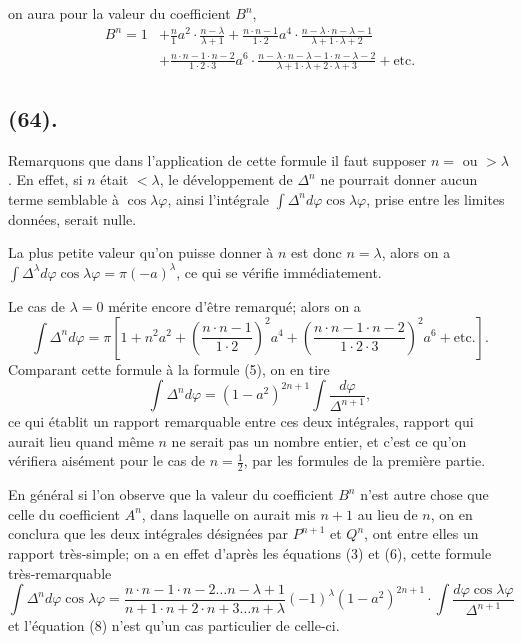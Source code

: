 \documentclass{article}
\begin{document}
on aura pour la valeur du coefficient $B^{n}$,
\[ \begin{aligned} B^{n}=1&+\frac{n}{1}a^{2}\cdot\frac{n-\lambda}{\lambda+1}+\frac{n\cdot n-1}{1\cdot2}a^{4}\cdot\frac{n-\lambda\cdot n-\lambda-1}{\lambda+1\cdot\lambda+2}\\ &+\frac{n\cdot n-1\cdot n-2}{1\cdot2\cdot3}a^{6}\cdot\frac{n-\lambda\cdot n-\lambda-1\cdot n-\lambda-2}{\lambda+1\cdot\lambda+2\cdot\lambda+3}+\text{etc.} \end{aligned} \tag{6} \]

\subsection*{(64).}

Remarquons que dans l'application de cette formule il faut supposer $n=$ ou $>\lambda$. En effet, si $n$ était $<\lambda$, le développement de $\Delta^{n}$ ne pourrait donner aucun terme semblable à $\cos\lambda\varphi$, ainsi l'intégrale $\displaystyle\int\Delta^{n}d\varphi\cos\lambda\varphi$, prise entre les limites données, serait nulle.

La plus petite valeur qu'on puisse donner à $n$ est donc $n=\lambda$, alors on a $\displaystyle\int\Delta^{\lambda}d\varphi\cos\lambda\varphi=\pi(-a)^{\lambda}$, ce qui se vérifie immédiatement.

Le cas de $\lambda=0$ mérite encore d'être remarqué; alors on a
\[ \int\Delta^{n}d\varphi=\pi\left[1+n^{2}a^{2}+\left(\frac{n\cdot n-1}{1\cdot2}\right)^{2}a^{4}+\left(\frac{n\cdot n-1\cdot n-2}{1\cdot2\cdot3}\right)^{2}a^{6}+\text{etc.}\right]. \tag{7} \]
Comparant cette formule à la formule (5), on en tire
\[ \int\Delta^{n}d\varphi=(1-a^{2})^{2n+1}\int\frac{d\varphi}{\Delta^{n+1}}, \tag{8} \]
ce qui établit un rapport remarquable entre ces deux intégrales, rapport qui aurait lieu quand même $n$ ne serait pas un nombre entier, et c'est ce qu'on vérifiera aisément pour le cas de $n=\frac{1}{2}$, par les formules de la première partie.

En général si l'on observe que la valeur du coefficient $B^{n}$ n'est autre chose que celle du coefficient $A^{n}$, dans laquelle on aurait mis $n+1$ au lieu de $n$, on en conclura que les deux intégrales désignées par $P^{n+1}$ et $Q^{n}$, ont entre elles un rapport très-simple; on a en effet d'après les équations (3) et (6), cette formule très-remarquable
\[ \int\Delta^{n}d\varphi\cos\lambda\varphi=\frac{n\cdot n-1\cdot n-2\ldots n-\lambda+1}{n+1\cdot n+2\cdot n+3\ldots n+\lambda}(-1)^{\lambda}(1-a^{2})^{2n+1}\cdot\int\frac{d\varphi\cos\lambda\varphi}{\Delta^{n+1}} \]
et l'équation (8) n'est qu'un cas particulier de celle-ci.
\end{document}

